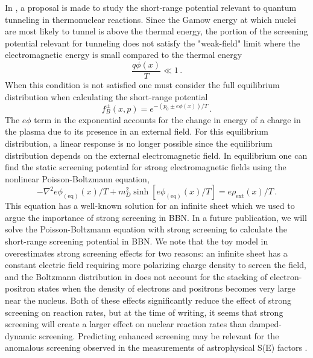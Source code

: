 In \cite{Grayson:2023flr}, a proposal is made to study the short-range potential relevant to quantum tunneling in thermonuclear reactions. Since the Gamow energy at which nuclei are most likely to tunnel is above the thermal energy, the portion of the screening potential relevant for tunneling does not satisfy the "weak-field" limit where the electromagnetic energy is small compared to the thermal energy
\begin{equation}
 \frac{q \phi(x)}{T} \ll 1\,.
\end{equation}
When this condition is not satisfied one must consider the full equilibrium distribution when calculating the short-range potential \cite{Hakim:1967prd,DeGroot:1980dk}
\begin{equation}\label{eq:Boltz}
 f_B^\pm(x,p) = e^{-(p_0\pm e\phi(x))/T}\,.
\end{equation}
The $e\phi$ term in the exponential accounts for the change in energy of a charge in the plasma due to its presence in an external field. For this equilibrium distribution, a linear response is no longer possible since the equilibrium distribution depends on the external electromagnetic field. In equilibrium one can find the static screening potential for strong electromagnetic fields using the nonlinear Poisson-Boltzmann equation,
\begin{equation}\label{eq:Poisson-Boltz}
 -\nabla^2 e\phi_{(\text{eq})}(x)/T +m_D^2\sinh\left[e\phi_{(\text{eq})}(x)/T\right] =e\rho_\mathrm{ext}(x)/T\,.
 \end{equation}
This equation has a well-known solution for an infinite sheet which we used to argue the importance of strong screening in BBN. 
In a future publication, we will solve the Poisson-Boltzmann equation with strong screening to calculate the short-range screening potential in BBN. We note that the toy model in \cite{Grayson:2023flr} overestimates strong screening effects for two reasons: an infinite sheet has a constant electric field requiring more polarizing charge density to screen the field, and the Boltzmann distribution in  does not account for the stacking of electron-positron states when the density of electrons and positrons becomes very large near the nucleus. Both of these effects significantly reduce the effect of strong screening on reaction rates, but at the time of writing, it seems that strong screening will create a larger effect on nuclear reaction rates than damped-dynamic screening. Predicting enhanced screening may be relevant for the anomalous screening observed in the measurements of astrophysical S(E) factors \cite{Zhang:2020nuc}.
 
